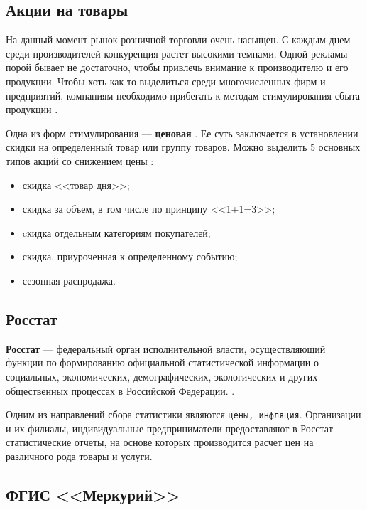 \subsection*{Акции на товары}

На данный момент рынок розничной торговли очень насыщен. 
С каждым днем среди производителей конкуренция растет высокими темпами. 
Одной рекламы порой бывает не достаточно, чтобы привлечь внимание к производителю и его продукции. 
Чтобы хоть как то выделиться среди многочисленных фирм и предприятий, компаниям необходимо прибегать к методам стимулирования сбыта продукции \cite{info_stock}.

Одна из форм стимулирования --- \textbf{ценовая} \cite{info_stock}. 
Ее суть заключается в установлении скидки на определенный товар или группу товаров.
Можно выделить 5 основных типов акций со снижением  цены \cite{info_promotion1, info_promotion2}:

\begin{itemize}[label*=--]
	\item скидка <<товар дня>>;
	\item скидка за объем, в том числе по принципу <<1+1=3>>;
	\item cкидка отдельным категориям покупателей;
	\item скидка, приуроченная к определенному событию;
	\item сезонная распродажа.
\end{itemize}

\subsection*{Росстат} %

\textbf{Росстат} ---  федеральный орган исполнительной власти, осуществляющий функции по формированию официальной статистической информации о социальных, экономических, демографических, экологических и других общественных процессах в Российской Федерации. \cite{info_rosstat}.

Одним из направлений сбора статистики являются \texttt{цены, инфляция}. 
Организации и их филиалы, индивидуальные предприниматели предоставляют в Росстат статистические отчеты, на основе которых производится расчет цен на различного рода товары и услуги.

\subsection*{ФГИС <<Меркурий>>}

